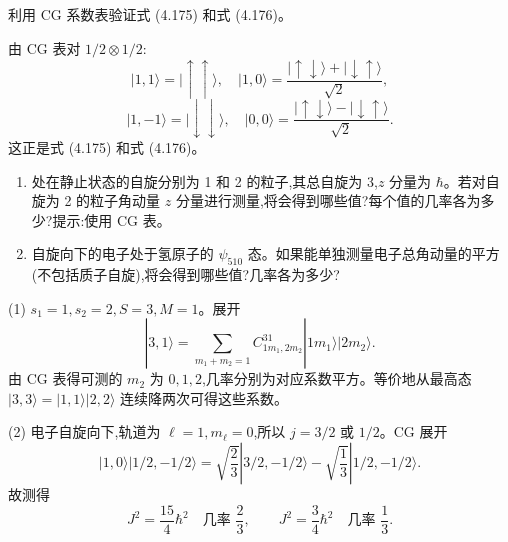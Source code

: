 \begin{question}
利用 CG 系数表验证式 (4.175) 和式 (4.176)。

\par\smallskip
{}

\begin{solution}

由 CG 表对 $1/2\otimes1/2$:
\[
|1,1\rangle=|\uparrow\uparrow\rangle,
\quad
|1,0\rangle=\frac{|\uparrow\downarrow\rangle+|\downarrow\uparrow\rangle}{\sqrt2},
\]
\[
|1,-1\rangle=|\downarrow\downarrow\rangle,
\quad
|0,0\rangle=\frac{|\uparrow\downarrow\rangle-|\downarrow\uparrow\rangle}{\sqrt2}.
\]
这正是式 (4.175) 和式 (4.176)。

\end{solution}
\end{question}

\begin{question}
\begin{enumerate}
\item 处在静止状态的自旋分别为 1 和 2 的粒子,其总自旋为 3,$z$ 分量为 $\hbar$。若对自旋为 2 的粒子角动量 $z$ 分量进行测量,将会得到哪些值?每个值的几率各为多少?提示:使用 CG 表。
\item 自旋向下的电子处于氢原子的 $\psi_{510}$ 态。如果能单独测量电子总角动量的平方(不包括质子自旋),将会得到哪些值?几率各为多少?
\end{enumerate}
\begin{solution}

(1) $s_1=1,s_2=2,S=3,M=1$。展开
\[
|3,1\rangle=\sum_{m_1+m_2=1}C_{1m_1,2m_2}^{31}|1m_1\rangle|2m_2\rangle.
\]
由 CG 表得可测的 $m_2$ 为 $0,1,2$,几率分别为对应系数平方。等价地从最高态 $|3,3\rangle=|1,1\rangle|2,2\rangle$ 连续降两次可得这些系数。

(2) 电子自旋向下,轨道为 $\ell=1,m_\ell=0$,所以 $j=3/2$ 或 $1/2$。CG 展开
\[
|1,0\rangle|1/2,-1/2\rangle
=\sqrt{\frac23}|3/2,-1/2\rangle-\sqrt{\frac13}|1/2,-1/2\rangle.
\]
故测得
\[
J^2=\frac{15}{4}\hbar^2\quad \text{几率 }\frac23,
\qquad
J^2=\frac34\hbar^2\quad \text{几率 }\frac13.
\]

\end{solution}
\end{question}

